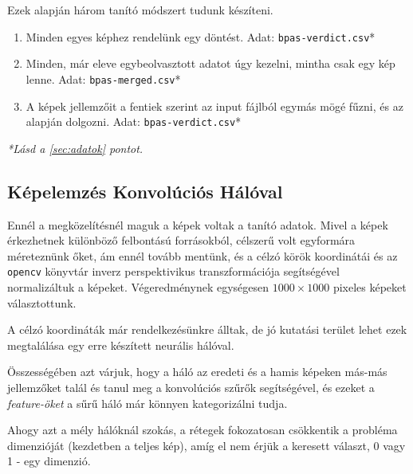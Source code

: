 Ezek alapján három tanító módszert tudunk készíteni. 
\begin{enumerate}
	\item
	Minden egyes képhez rendelünk egy döntést.
	Adat: \texttt{bpas-verdict.csv}*
	\item 
	Minden, már eleve egybeolvasztott adatot úgy kezelni, mintha csak 
	egy kép lenne. Adat: \texttt{bpas-merged.csv}*
	
	\item 
	A képek jellemzőit a fentiek szerint az input fájlból egymás mögé 
	fűzni, és az alapján dolgozni.
	Adat: \texttt{bpas-verdict.csv}*
\end{enumerate}

\textit{*Lásd a \ref{sec:adatok} pontot.}
%
%
%
%
%
%


\newpage
\subsection{Képelemzés Konvolúciós Hálóval}

Ennél a megközelítésnél maguk a képek voltak a tanító adatok.
Mivel a képek érkezhetnek különböző felbontású forrásokból, célszerű volt
egyformára méreteznünk őket, ám ennél tovább mentünk, és a célzó körök koordinátái 
és az \texttt{opencv} könyvtár inverz perspektivikus transzformációja segítségével 
normalizáltuk a képeket. Végeredménynek egységesen $ 1000 \times 1000 $ pixeles képeket
választottunk.

A célzó koordináták már rendelkezésünkre álltak, de jó kutatási terület lehet ezek 
megtalálása egy erre készített neurális hálóval.


Összességében azt várjuk, hogy a háló az eredeti és a hamis képeken más-más 
jellemzőket talál és tanul meg a konvolúciós szűrők segítségével, és ezeket
a \textit{feature-öket} a sűrű háló már könnyen kategorizálni tudja.

Ahogy azt a mély hálóknál szokás, a rétegek fokozatosan csökkentik a probléma
dimenzióját (kezdetben a teljes kép), amíg el nem érjük a keresett választ, 0 vagy 1 - 
egy dimenzió.

